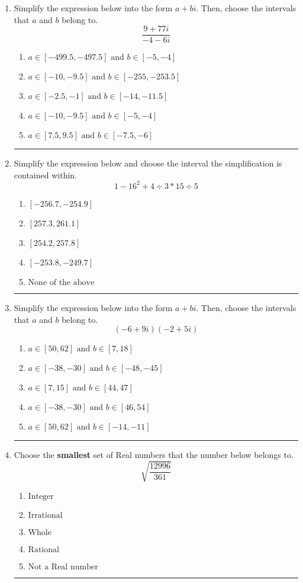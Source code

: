\documentclass[14pt]{extbook}
\newcommand{\litem}[1]{\item#1\hspace*{-1cm}\rule{\textwidth}{0.4pt}}
\begin{document}
\begin{enumerate}
{\begin{enumerate}[label=\Alph*.]
\end{enumerate} }
\litem{
Simplify the expression below into the form $a+bi$. Then, choose the intervals that $a$ and $b$ belong to.\[ \frac{9 + 77 i}{-4 - 6 i} \]\begin{enumerate}[label=\Alph*.]
\item \( a \in [-499.5, -497.5] \text{ and } b \in [-5, -4] \)
\item \( a \in [-10, -9.5] \text{ and } b \in [-255, -253.5] \)
\item \( a \in [-2.5, -1] \text{ and } b \in [-14, -11.5] \)
\item \( a \in [-10, -9.5] \text{ and } b \in [-5, -4] \)
\item \( a \in [7.5, 9.5] \text{ and } b \in [-7.5, -6] \)

\end{enumerate} }
\litem{
Simplify the expression below and choose the interval the simplification is contained within.\[ 1 - 16^2 + 4 \div 3 * 15 \div 5 \]\begin{enumerate}[label=\Alph*.]
\item \( [-256.7, -254.9] \)
\item \( [257.3, 261.1] \)
\item \( [254.2, 257.8] \)
\item \( [-253.8, -249.7] \)
\item \( \text{None of the above} \)

\end{enumerate} }
\litem{
Simplify the expression below into the form $a+bi$. Then, choose the intervals that $a$ and $b$ belong to.\[ (-6 + 9 i)(-2 + 5 i) \]\begin{enumerate}[label=\Alph*.]
\item \( a \in [50, 62] \text{ and } b \in [7, 18] \)
\item \( a \in [-38, -30] \text{ and } b \in [-48, -45] \)
\item \( a \in [7, 15] \text{ and } b \in [44, 47] \)
\item \( a \in [-38, -30] \text{ and } b \in [46, 54] \)
\item \( a \in [50, 62] \text{ and } b \in [-14, -11] \)

\end{enumerate} }
\litem{
Choose the \textbf{smallest} set of Real numbers that the number below belongs to.\[ \sqrt{\frac{12996}{361}} \]\begin{enumerate}[label=\Alph*.]
\item \( \text{Integer} \)
\item \( \text{Irrational} \)
\item \( \text{Whole} \)
\item \( \text{Rational} \)
\item \( \text{Not a Real number} \)


\end{enumerate}}
\end{enumerate}
\end{document}

